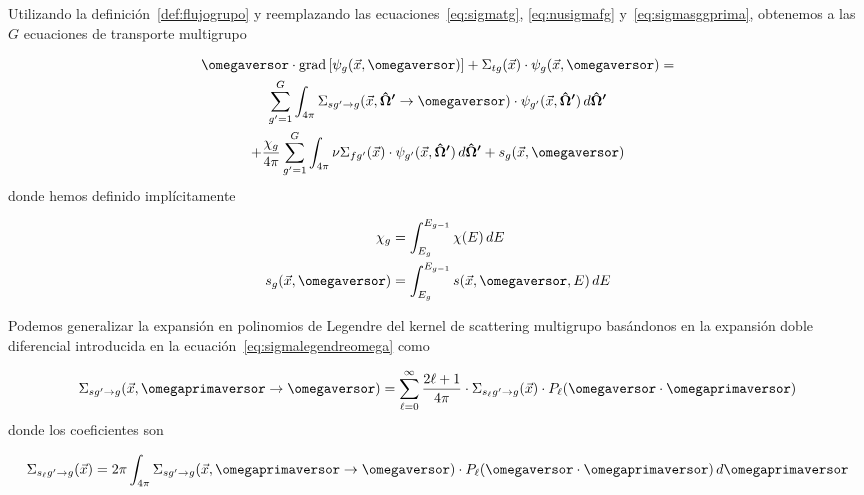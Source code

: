 Utilizando la definición~\ref{def:flujogrupo} y reemplazando las ecuaciones~\eqref{eq:sigmatg}, \eqref{eq:nusigmafg} y~\eqref{eq:sigmasggprima}, obtenemos a las~$G$ ecuaciones de transporte multigrupo

\begin{multline}\label{eq:transportemultigrupo}
 \omegaversor \cdot \text{grad} \left[ \psi_g(\vec{x}, \omegaversor) \right]
 + \Sigma_{t g}(\vec{x}) \cdot \psi_g(\vec{x}, \omegaversor) = \\
 \sum_{g^\prime=1}^G \int_{4\pi} \Sigma_{sg^\prime \rightarrow g}(\vec{x}, \boldsymbol{\hat{\Omega}^\prime} \rightarrow \omegaversor) \cdot \psi_{g^\prime}(\vec{x}, \boldsymbol{\hat{\Omega}^\prime}) \, d\boldsymbol{\hat{\Omega}^\prime} \\
+ \frac{\chi_g}{4\pi} \sum_{g^\prime=1}^G \int_{4\pi} \nu\Sigma_{fg^\prime}(\vec{x}) \cdot \psi_{g^\prime}(\vec{x}, \boldsymbol{\hat{\Omega}^\prime}) \, d\boldsymbol{\hat{\Omega}^\prime}
+ s_g(\vec{x}, \omegaversor)
\end{multline}
%
donde hemos definido implícitamente

\begin{align*}
\chi_g &= \int_{E_g}^{E_{g-1}} \chi(E) \, dE\\
s_g(\vec{x}, \omegaversor) &= \int_{E_g}^{E_{g-1}} s(\vec{x}, \omegaversor, E) \, dE
\end{align*}

\bigskip

Podemos generalizar la expansión en polinomios de Legendre del kernel de scattering multigrupo basándonos en la expansión doble diferencial introducida en la ecuación~\eqref{eq:sigmalegendreomega} como

\begin{equation}\label{eq:sigmasgprimeglegendre}
 \Sigma_{sg^\prime \rightarrow g}(\vec{x}, \omegaprimaversor\rightarrow \omegaversor) = \sum_{\ell=0}^{\infty} \frac{2\ell + 1}{4\pi} \cdot \Sigma_{s_\ell g^\prime \rightarrow g}(\vec{x}) \cdot P_\ell(\omegaversor \cdot \omegaprimaversor)
\end{equation}
%
donde los coeficientes son

\begin{equation}\label{eq:sigmasgprimegcoef}
 \Sigma_{s_\ell g^\prime \rightarrow g}(\vec{x}) =
 2\pi \int_{4\pi} \Sigma_{s g^\prime \rightarrow g}(\vec{x}, \omegaprimaversor \rightarrow \omegaversor) \cdot P_\ell(\omegaversor \cdot \omegaprimaversor) \, d\omegaprimaversor
\end{equation}

